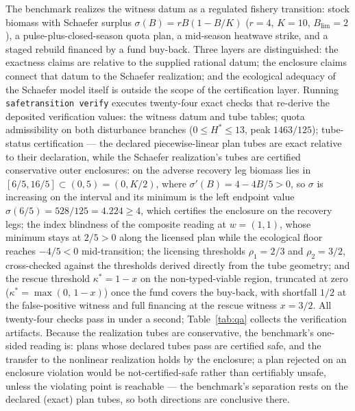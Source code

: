 \documentclass[11pt]{article}
\begin{document}
The benchmark realizes the witness datum as a regulated fishery transition:
stock biomass with Schaefer surplus $\sigma(B) = rB(1 - B/K)$ ($r = 4$,
$K = 10$, $B_{\mathrm{lim}} = 2$), a pulse-plus-closed-season quota plan,
a mid-season heatwave strike, and a staged rebuild financed by a fund
buy-back. Three layers are distinguished: the exactness claims are
relative to the supplied rational datum; the enclosure claims connect
that datum to the Schaefer realization; and the ecological adequacy of
the Schaefer model itself is outside the scope of the certification
layer. Running \texttt{safetransition verify} executes twenty-four exact
checks that re-derive the deposited verification values: the witness datum
and tube tables; quota admissibility on both disturbance branches
($0 \leq H^* \leq 13$, peak $1463/125$); tube-status certification --- the
declared piecewise-linear plan tubes are exact relative to their
declaration, while the Schaefer realization's tubes are certified
conservative outer enclosures: on the adverse recovery leg biomass lies
in $[6/5, 16/5] \subset (0, 5) = (0, K/2)$, where
$\sigma'(B) = 4 - 4B/5 > 0$, so $\sigma$ is increasing on the interval
and its minimum is the left endpoint value $\sigma(6/5) = 528/125 = 4.224
\geq 4$, which certifies the enclosure on the recovery legs; the
index blindness of the composite reading at $w = (1, 1)$, whose minimum
stays at $2/5 > 0$ along the licensed plan while the ecological floor
reaches $-4/5 < 0$ mid-transition; the licensing thresholds
$\rho_1 = 2/3$ and $\rho_2 = 3/2$, cross-checked against the thresholds
derived directly from the tube geometry; and the rescue threshold
$\kappa^* = 1 - x$ on the non-typed-viable region, truncated at zero
($\kappa^* = \max(0,\, 1-x)$) once the fund covers the buy-back, with
shortfall $1/2$ at the false-positive witness and full financing at the
rescue witness $x = 3/2$. All twenty-four checks pass in under a second;
Table~\ref{tab:qa} collects the verification artifacts. Because the
realization tubes are conservative, the benchmark's one-sided reading is:
plans whose declared tubes pass are certified safe, and the transfer to
the nonlinear realization holds by the enclosure; a plan rejected on an
enclosure violation would be not-certified-safe rather than certifiably
unsafe, unless the violating point is reachable --- the benchmark's
separation rests on the declared (exact) plan tubes, so both directions
are conclusive there.
\end{document}
